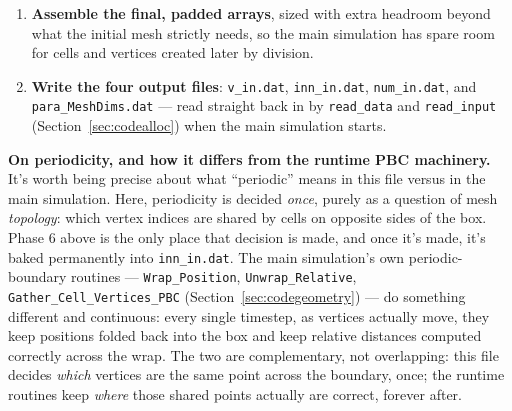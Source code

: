 \documentclass[11pt]{article}
\begin{document}
\begin{enumerate}[nosep, leftmargin=1.7em]
  welded independently in the previous phase, so a vertex physically shared between,
  say, the left edge and its periodic partner on the right edge was actually computed
  \emph{twice} --- once directly, once via its ghost image --- landing at positions that
  differ by exactly one lattice period, not by a tiny numerical error, so the ordinary
  vertex-welding tolerance never catches them. This phase specifically looks for such
  pairs near the domain's edges, checks all 8 exact periodic shifts, and merges their
  indices using a union--find (``disjoint set'') data structure
  (\texttt{find\_root}/\texttt{union\_vertices}, below) --- exactly the standard
  technique for efficiently merging equivalence classes. A final check confirms every
  vertex now touches at least 3 cells (as a properly closed, wrap-connected mesh
  should), stopping the program if not.
  \item \textbf{Assemble the final, padded arrays}, sized with extra headroom beyond
  what the initial mesh strictly needs, so the main simulation has spare room for cells
  and vertices created later by division.
  \item \textbf{Write the four output files}: \texttt{v\_in.dat}, \texttt{inn\_in.dat},
  \texttt{num\_in.dat}, and \texttt{para\_MeshDims.dat} --- read straight back in by
  \texttt{read\_data} and \texttt{read\_input} (Section~\ref{sec:codealloc}) when the
  main simulation starts.
\end{enumerate}

\textbf{On periodicity, and how it differs from the runtime PBC machinery.} It's worth
being precise about what ``periodic'' means in this file versus in the main simulation.
Here, periodicity is decided \emph{once}, purely as a question of mesh \emph{topology}:
which vertex indices are shared by cells on opposite sides of the box. Phase 6 above is
the only place that decision is made, and once it's made, it's baked permanently into
\texttt{inn\_in.dat}. The main simulation's own periodic-boundary routines ---
\texttt{Wrap\_Position}, \texttt{Unwrap\_Relative}, \texttt{Gather\_Cell\_Vertices\_PBC}
(Section~\ref{sec:codegeometry}) --- do something different and continuous: every
single timestep, as vertices actually move, they keep positions folded back into the
box and keep relative distances computed correctly across the wrap. The two are
complementary, not overlapping: this file decides \emph{which} vertices are the same
point across the boundary, once; the runtime routines keep \emph{where} those shared
points actually are correct, forever after.
\end{document}
